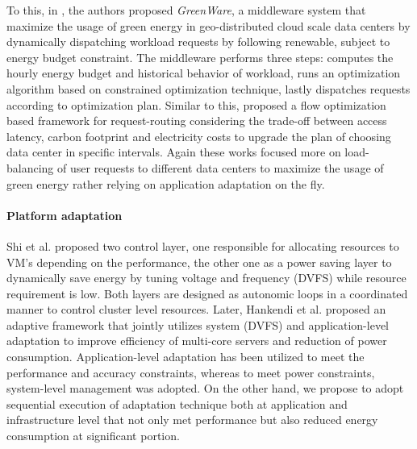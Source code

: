 To this, in \cite{GreenWare}, the authors proposed \emph{GreenWare}, a middleware system that maximize the usage of green energy in geo-distributed cloud scale data centers by dynamically dispatching workload requests by following renewable, subject to energy budget constraint. The middleware performs three steps: computes the hourly energy budget and historical behavior of workload, runs an optimization algorithm based on constrained optimization technique, lastly dispatches requests according to optimization plan. Similar to this, \cite{not-easy} proposed a flow optimization based framework for request-routing considering the trade-off between access latency, carbon footprint and electricity costs to upgrade the plan of choosing data center in specific intervals. Again these works focused more on load-balancing of user requests to different data centers to maximize the usage of green energy rather relying on application adaptation on the fly.



\paragraph*{\textbf{Platform adaptation}}

Shi et al. \cite{shi} proposed two control layer, one responsible for allocating resources to VM's depending on the performance, the other one as a power saving layer to dynamically save energy by tuning voltage and frequency (DVFS) while resource requirement is low. Both layers are designed as autonomic loops in a coordinated
manner to control cluster level resources. Later, Hankendi et al. \cite{adaptcap} proposed an adaptive framework that jointly utilizes system (DVFS) and application-level
adaptation to improve efficiency of multi-core servers and reduction of power consumption. Application-level adaptation has been utilized to meet the performance
and accuracy constraints, whereas to meet power constraints, system-level
management was adopted. On the other hand, we propose to adopt sequential execution  of adaptation technique both at application and infrastructure level that not only met performance but also reduced energy consumption at significant portion. 

